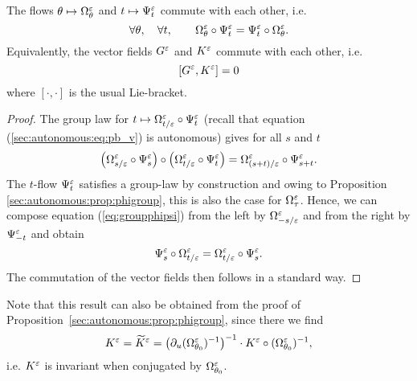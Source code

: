 %
\begin{proposition} \label{sec:autonomous:prop:commut}
  The flows $\theta \mapsto \Omega^{\varepsilon}_\theta$ and $t \mapsto
  \Psi^{\varepsilon}_t$ commute with each other, i.e.
  $$
  \forall \theta, \quad \forall t, \qquad \Omega^{\varepsilon}_\theta \circ \Psi^{\varepsilon}_{t} = \Psi^{\varepsilon}_{t} \circ \Omega^{\varepsilon}_\theta.
  $$
  Equivalently, the vector fields $G^{\varepsilon}$ and $K^{\varepsilon}$ commute with each
  other, i.e.
  $$
  [G^{\varepsilon},K^{\varepsilon}]=0
  $$
  where $[\cdot,\cdot]$ is the usual Lie-bracket.
\end{proposition}
\begin{proof}
  The group law for $t \mapsto \Omega^{\varepsilon}_{t/\varepsilon} \circ \Psi^{\varepsilon}_{t}$
  (recall that equation (\ref{sec:autonomous:eq:pb_v}) is autonomous) gives for all $s$
  and $t$
  \begin{align} \label{eq:groupphipsi}
    \left(\Omega^{\varepsilon}_{s/\varepsilon} \circ \Psi^{\varepsilon}_{s} \right) \circ \left(\Omega^{\varepsilon}_{t/\varepsilon} \circ \Psi^{\varepsilon}_{t} \right) = \Omega^{\varepsilon}_{(s+t)/\varepsilon} \circ \Psi^{\varepsilon}_{s+t}.
  \end{align}
  The $t$-flow $\Psi^{\varepsilon}_t$ satisfies a group-law by construction and
  owing to Proposition \ref{sec:autonomous:prop:phigroup}, this is also
  the case for $\Omega^{\varepsilon}_\tau$. Hence, we can compose equation
  (\ref{eq:groupphipsi}) from the left by $\Omega^{\varepsilon}_{-s/\varepsilon}$ and from
  the right by $\Psi^{\varepsilon}_{-t}$ and obtain 
  $$
  \Psi^{\varepsilon}_{s}  \circ \Omega^{\varepsilon}_{t/\varepsilon} = \Omega^{\varepsilon}_{t/\varepsilon} \circ \Psi^{\varepsilon}_{s}.
  $$
  The commutation of the vector fields then follows in a standard way. 
\end{proof}

Note that this result can also be obtained from the proof of
Proposition~\ref{sec:autonomous:prop:phigroup}, since there we find 
\begin{equation*}
  K^{\varepsilon} = \widetilde{K}^{\varepsilon} = \left(\partial_u
    (\Omega^{\varepsilon}_{\theta_0})^{-1}\right)^{-1} \cdot K^{\varepsilon} \circ
    (\Omega^{\varepsilon}_{\theta_0})^{-1} ,
\end{equation*}
i.e. $K^{\varepsilon}$ is invariant when conjugated by $\Omega^{\varepsilon}_{\theta_0}$.



